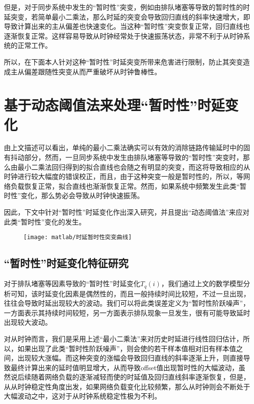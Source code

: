 但是，对于同步系统中发生的“暂时性”突变，例如由排队堵塞等导致的暂时性的时延突变，若简单最小二乘法，那么时延的突变会导致回归直线的斜率快速增大，即导致计算出来的主从偏差也快速变化。当这种“暂时性”突变恢复正常，回归直线也逐渐恢复正常。这样容易导致从时钟经常处于快速振荡状态，非常不利于从时钟系统的正常工作。

所以，在下面本人针对这种“暂时性”时延突变所带来危害进行限制，防止其突变造成主从偏差跟随性突变从而严重破坏从时钟鲁棒性。

\section{基于动态阈值法来处理“暂时性”时延变化}
由上文描述可以看出，单纯的最小二乘法确实可以有效的消除链路传输延时中的固有抖动部分，然而，一旦同步系统中发生由排队堵塞等导致的“暂时性”突变时，那么由最小二乘法回归得到的拟合直线也会随之有明显的突变，而这将导致相应的从时钟进行较大幅度的错误校正，而且，由于这种突变一般是暂时性的，所以，等网络负载恢复正常，拟合直线也渐渐恢复正常。然而，如果系统中频繁发生此类“暂时性”变化，那么势必会导致从时钟快速振荡。

因此，下文中针对“暂时性”时延变化作出深入研究，并且提出“动态阈值法”来应对此类“暂时性”变化的发生。

\begin{figure}[!hbp]
  \centering
  \begin{minipage}[b]{0.6\textwidth}
    \captionstyle{\centering}
    \centering
    \texttt{[image: matlab/时延暂时性突变曲线]}
  \end{minipage}     
\end{figure}

\subsection{“暂时性”时延变化特征研究}
对于排队堵塞等因素导致的“暂时性”时延变化$T_{q}(i)$，我们通过上文的数学模型分析可知，该时延变化因素是偶然性的，而且一般持续时间比较短，不过一旦出现，往往会导致时延出现较大的波动。我们可以将此类误差定义为“暂时性阶跃噪声”，一方面表示其持续时间较短，另一方面表示排队现象一旦发生，很有可能导致延时出现较大波动。

对从时钟而言，我们是采用上述“最小二乘法”来对历史时延进行线性回归估计，所以，如果出现了此类“暂时性阶跃噪声”，则会使的若干样本值相对旧有样本值之间，出现较大涨幅。而这种突变的涨幅会导致回归直线的斜率逐渐上升，则直接导致最终计算出来的延时值明显增大，从而导致offset值出现暂时性的大幅波动，虽然说后续随着网络负载的逐渐减轻而使的时延值及回归直线斜率逐渐恢复，但是，从从时钟稳定性角度出发，如果网络负载变化比较频繁，那么从时钟则会不断处于大幅波动之中，这对于从时钟系统稳定性极为不利。

